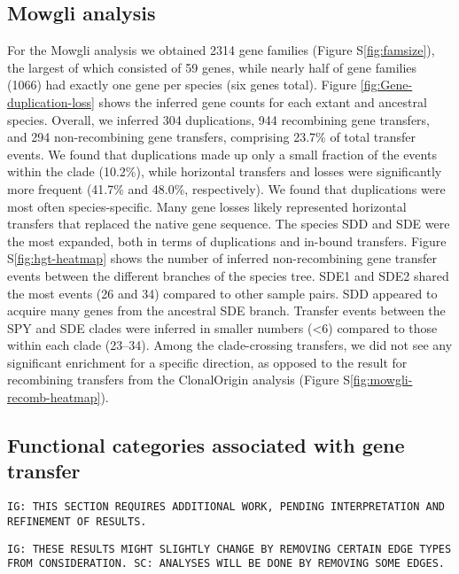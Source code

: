 \documentclass[english]{article}
\begin{document}
\subsection{Mowgli analysis}
For the Mowgli analysis we obtained 2314 gene families (Figure
S\ref{fig:famsize}), the largest of which consisted of 59 genes, while
nearly half of gene families (1066) had exactly one gene per species
(six genes total).  Figure \ref{fig:Gene-duplication-loss} shows the
inferred gene counts for each extant and ancestral species. Overall,
we inferred 304 duplications, 944 recombining gene transfers, and 294
non-recombining gene transfers, comprising 23.7\% of total transfer
events.  We found that duplications made up only a small fraction of
the events within the clade (10.2\%), while horizontal transfers and
losses were significantly more frequent (41.7\% and 48.0\%,
respectively). We found that duplications were most often
species-specific. Many gene losses likely represented horizontal
transfers that replaced the native gene sequence.  The species SDD and
SDE were the most expanded, both in terms of duplications and in-bound
transfers. Figure S\ref{fig:hgt-heatmap} shows the number of inferred
non-recombining gene transfer events between the different branches of
the species tree.
SDE1 and SDE2 shared the most events (26 and 34) compared to other sample pairs. 
SDD appeared to acquire many genes from the ancestral SDE branch. Transfer 
events between the SPY and SDE clades were inferred in smaller numbers (<6) 
compared to those within each clade (23--34). Among the clade-crossing 
transfers, we did not see any significant enrichment for a specific direction, 
as opposed to the result for recombining transfers from the ClonalOrigin 
analysis (Figure S\ref{fig:mowgli-recomb-heatmap}).

\subsection{Functional categories associated with gene transfer}

\texttt{IG: THIS SECTION REQUIRES ADDITIONAL WORK, PENDING INTERPRETATION AND 
REFINEMENT OF RESULTS. }

\texttt{IG: THESE RESULTS MIGHT SLIGHTLY CHANGE BY REMOVING CERTAIN EDGE TYPES 
FROM CONSIDERATION. SC: ANALYSES WILL BE DONE BY REMOVING SOME EDGES.}
\end{document}
